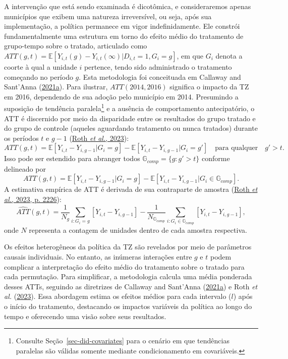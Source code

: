 \documentclass[12pt, a4paper, twoside]{article}
\numberwithin{equation}{subsection} %
\begin{document}
A intervenção que está sendo examinada é dicotômica, e consideraremos
apenas municípios que exibem uma natureza irreversível, ou seja, após
sua implementação, a política permanece em vigor indefinidamente. Ele
constrói fundamentalmente uma estrutura em torno do efeito médio do
tratamento de grupo-tempo sobre o tratado, articulado como
\(ATT(g, t) = \mathbb{E}[Y_{i,t}(g) - Y_{i,t}(\infty) | D_{i,t} = 1, G_i = g]\),
em que \(G_i\) denota a coorte à qual a unidade \(i\) pertence, tendo
sido administrado o tratamento começando no período \(g\). Esta
metodologia foi conceituada em Callaway and Sant'Anna
(\protect\hyperlink{ref-CALLAWAY2021200}{2021a}). Para ilustrar,
\(ATT(2014, 2016)\) significa o impacto da TZ em 2016, dependendo de sua
adoção pelo município em 2014. Presumindo a suposição de tendência
paralela\footnote{Consulte Seção~\ref{sec-did-covariates} para o cenário
  em que tendências paralelas são válidas somente mediante
  condicionamento em covariáveis.} e a ausência de comportamento
antecipatório, o ATT é discernido por meio da disparidade entre os
resultados do grupo tratado e do grupo de controle (aqueles aguardando
tratamento ou nunca tratados) durante os períodos \(t\) e \(g-1\)
(\protect\hyperlink{ref-roth_whats_2023}{Roth \emph{et al.}, 2023}):
\begin{equation*}
ATT(g, t) = \mathbb{E}[Y_{i,t} - Y_{i,g-1} | G_i = g] - \mathbb{E}[Y_{i,t} - Y_{i,g-1} | G_i = g'] \quad \text{para qualquer} \quad g' > t.
\end{equation*} Isso pode ser estendido para abranger todos
\(\mathbb{G}_{comp} = \{g: g' > t\}\) conforme delineado por
\begin{equation} \label{eq-att}
ATT(g, t) = \mathbb{E}[Y_{i,t} - Y_{i,g-1} | G_i = g] - \mathbb{E}[Y_{i,t} - Y_{i,g-1} | G_i \in \mathbb{G}_{comp}].
\end{equation} A estimativa empírica de ATT é derivada de sua
contraparte de amostra (\protect\hyperlink{ref-roth_whats_2023}{Roth
\emph{et al.}, 2023, p. 2226}):
\begin{equation} \label{eq-att-estimator}
\widehat{ATT}(g, t) = \frac{1}{N_g} \sum_{i:G_i=g} \left[ Y_{i,t} - Y_{i,g-1} \right] - \frac{1}{N_{\mathbb{G}_{comp}}} \sum_{i:G_i \in \mathbb{G}_{comp}} \left[ Y_{i,t} - Y_{i,g-1} \right],
\end{equation} onde \(N\) representa a contagem de unidades dentro de
cada amostra respectiva.

Os efeitos heterogêneos da política da TZ são revelados por meio de
parâmetros causais individuais. No entanto, as inúmeras interações entre
\(g\) e \(t\) podem complicar a interpretação do efeito médio do
tratamento sobre o tratado para cada permutação. Para simplificar, a
metodologia calcula uma média ponderada desses ATTs, seguindo as
diretrizes de Callaway and Sant'Anna
(\protect\hyperlink{ref-CALLAWAY2021200}{2021a}) e Roth \emph{et al.}
(\protect\hyperlink{ref-roth_whats_2023}{2023}). Essa abordagem estima
os efeitos médios para cada intervalo (\(l\)) após o início do
tratamento, destacando os impactos variáveis \hspace{0pt}\hspace{0pt}da
política ao longo do tempo e oferecendo uma visão sobre seus resultados.
\end{document}
